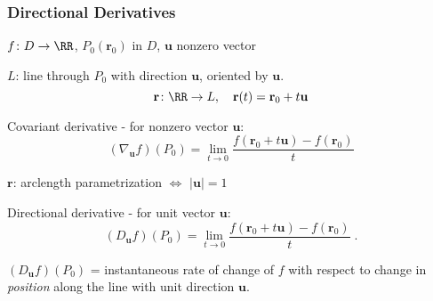 \begin{frame}
  \frametitle{Directional Derivatives}

  $f \colon D \to \RR$, $P_0(\textbf{r}_0)$ in $D$,
  $\textbf{u}$ nonzero vector

  $L$: line through $P_0$ with direction $\textbf{u}$,
  \textcolor[rgb]{0.98,0.00,0.00}{oriented} by $\textbf{u}$.
  $$\textbf{r}\colon \RR \to L, \quad \textbf{r}(t) =
  \textbf{r}_0+t\textbf{u}$$

  \pause \textcolor[rgb]{0.98,0.00,0.00}{Covariant derivative} -
  for \textcolor[rgb]{0.98,0.00,0.00}{nonzero} vector $\textbf{u}$:
  $$(\nabla_{\textbf{u}} f) (P_0) = \lim_{t\to 0}
  \frac{f(\textbf{r}_0+t\textbf{u}) - f(\textbf{r}_0)}{t}$$

  \pause $\textbf{r}$: arclength parametrization \pause
  $\Longleftrightarrow$ $|\textbf{u}|=1$

  \pause \textcolor[rgb]{0.98,0.00,0.00}{Directional derivative} - for \textcolor[rgb]{0.98,0.00,0.00}{unit} vector
  $\textbf{u}$:
  $$(D_{\textbf{u}} f)(P_0) =
  \lim_{t\to 0} \frac{f(\textbf{r}_0+t\textbf{u})-f(\textbf{r}_0)}{t}\; .$$

  \pause $(D_{\textbf{u}} f)(P_0)$ = instantaneous rate of change of $f$
  with respect to change in \emph{position} along the line
  with \textcolor[rgb]{0.98,0.00,0.00}{unit} direction $\textbf{u}$.
\end{frame}